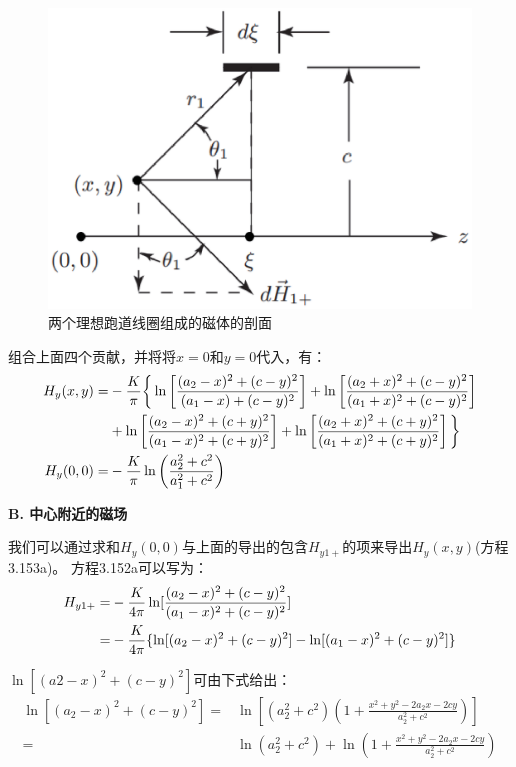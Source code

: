 \begin{figure}[htbp]
	\centering
	\includegraphics[scale=0.6]{chpt3/figs/fig3.37.eps}
	\caption{两个理想跑道线圈组成的磁体的剖面
	}
\end{figure}

组合上面四个贡献，并将将$x=0$和$y=0$代入，有：
\begin{subequations}
	\begin{align}
H_{y}(x,y)=&-\frac{K}{\pi}\bigg\{\ln\left[\frac{(a_{2}-x)^{2}+(c-y)^{2}}{(a_{1}-x)+(c-y)^{2}}\right]+\ln\left[\frac{(a_{2}+x)^{2}+(c-y)^{2}}{(a_{1}+x)^{2}+(c-y)^{2}}\right]\notag\\
&+\ln\left[\frac{(a_{2}-x)^{2}+(c+y)^{2}}{(a_{1}-x)^{2}+(c+y)^{2}}\right]+\ln\left[\frac{(a_{2}+x)^{2}+(c+y)^{2}}{(a_{1}+x)^{2}+(c+y)^{2}}\right]\bigg\}\\
H_{y}(0,0)=&-\frac{K}{\pi}\ln\left(\frac{a_{2}^{2}+c^{2}}{a_{1}^{2}+c^{2}}\right)%
\end{align}
\end{subequations}

\textbf{B. 中心附近的磁场}

我们可以通过求和$H_y(0,0)$与上面的导出的包含$H_{y1+}$的项来导出$H_y(x,y)$(方程3.153a)。
方程3.152a可以写为：
\begin{align}
H_{y1+}=&-\frac{K}{4\pi}\ln[\frac{(a_{2}-x)^{2}+(c-y)^{2}}{(a_{1}-x)^{2}+(c-y)^{2}}]\\
=&-\frac{K}{4\pi}\{\ln[(a_{2}-x)^{2}+(c-y)^{2}]-\ln[(a_{1}-x)^{2}+(c-y)^{2}]\}\notag
\end{align}

$\ln[(a2−x)^2+(c−y)^2]$可由下式给出：
\begin{align*}
\ln[(a_{2}-x)^{2}+(c-y)^{2}]=&\ln[(a_{2}^{2}+c^{2})(1+\frac{x^{2}+y^{2}-2a_{2}x-2cy}{a_{2}^{2}+c^{2}})]\\
=&\ln(a_{2}^{2}+c^{2})+\ln(1+\frac{x^{2}+y^{2}-2a_{2}x-2cy}{a_{2}^{2}+c^{2}})
\end{align*}


